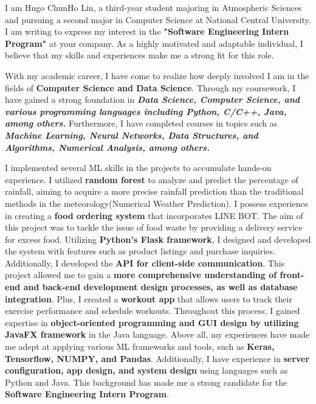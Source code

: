 
I am Hugo ChunHo Lin, a third-year student majoring in Atmospheric Sciences and pursuing a second major in Computer Science at National Central University. I am writing to express my interest in the \textbf{"Software Engineering Intern Program"} at your company. As a highly motivated and adaptable individual, I believe that my skills and experiences make me a strong fit for this role.

With my academic career, I have come to realize how deeply involved I am in the fields of \textbf{Computer Science and Data Science}. Through my coursework, I have gained a strong foundation in \textit{\textbf{Data Science, Computer Science, and various programming languages including Python, C/C++, Java, among others.}} Furthermore, I have completed courses in topics such as \textit{\textbf{Machine Learning, Neural Networks, Data Structures, and Algorithms, Numerical Analysis, among others.}}

I implemented several ML skills in the projects to accumulate hands-on experience. 
I utilized \textbf{random forest} to analyze and predict the percentage of rainfall, aiming to acquire a more precise rainfall prediction than the traditional methods in the meteorology(Numerical Weather Prediction). 
I possess experience in creating a \textbf{food ordering system} that incorporates LINE BOT. The aim of this project was to tackle the issue of food waste by providing a delivery service for excess food. Utilizing \textbf{Python's Flask framework}, I designed and developed the system with features such as product listings and purchase inquiries. Additionally, I developed the \textbf{API for client-side communication}. This project allowed me to gain a \textbf{more comprehensive understanding of front-end and back-end development design processes, as well as database integration}.
Plus, I created a \textbf{workout app} that allows users to track their exercise performance and schedule workouts. Throughout this process, I gained expertise in \textbf{object-oriented programming and GUI design by utilizing JavaFX framework} in the Java language.
Above all, my experiences have made me adept at applying various ML frameworks and tools, such as \textbf{Keras, Tensorflow, NUMPY, and Pandas}. Additionally, I have experience in \textbf{server configuration, app design, and system design} using languages such as Python and Java. This background has made me a strong candidate for the \textbf{Software Engineering Intern Program}. 

